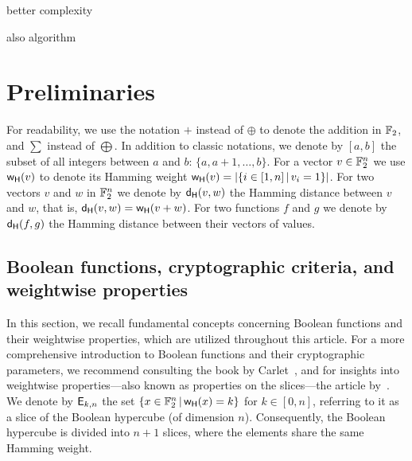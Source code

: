 \documentclass[11pt]{llncs}
\begin{document}
better complexity~\cite{EC:ACGKMR06}

also algorithm~\cite{FSE:DidTil06}




\section{Preliminaries}\label{sec:prelim}


For readability, we use the notation $+$ instead of 
$\oplus$ to denote the addition in $\mathbb{F}_2$, and $\sum$ instead of $\bigoplus$. 
In addition to classic notations, we denote by $ [a,b] $ the subset of all integers between $a$ and $b$: $\{a, a+1, \ldots,b\}$. 
For a vector $v\in \mathbb{F}_2^n$ we use $\mathsf{w_H}(v)$ to denote its Hamming weight $\mathsf{w_H}(v)=|\{ i \in [1,n] \, | \, v_i=1 \}|$. 
For two vectors $v$ and $w$ in $\mathbb{F}_2^n$ we denote by $\mathsf{d_H}(v,w)$ the Hamming distance between $v$ and $w$, that is, $\mathsf{d_H}(v,w)=\mathsf{w_H}(v+w)$. 
For two functions $f$ and $g$ we denote by $\mathsf{d_H}(f,g)$ the Hamming distance between their vectors of values.




\subsection{Boolean functions, cryptographic criteria, and weightwise properties}
In this section, we recall fundamental concepts concerning Boolean functions and their weightwise properties, which are utilized throughout this article. For a more comprehensive introduction to Boolean functions and their cryptographic parameters, we recommend consulting the book by Carlet~\cite{Carlet20},
and for insights into weightwise properties—also known as properties on the slices—the article by~\cite{TOSC:CarMeaRot17}.
We denote by $\mathsf{E}_{k,n}$ the set $\{x\in \mathbb{F}_2^n \, | \, \mathsf{w_H}(x)=k \}$ for $k \in [0,n]$, referring to it as a slice of the Boolean hypercube (of dimension $n$). 
Consequently, the Boolean hypercube is divided into $n+1$ slices, where the elements share the same Hamming weight.
\end{document}
